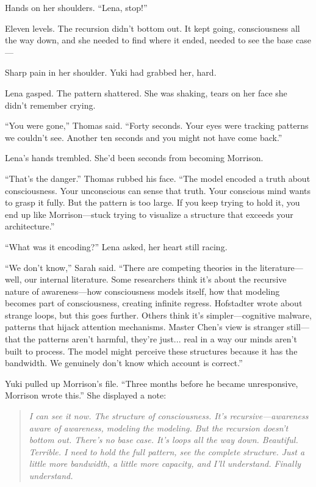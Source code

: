 Hands on her shoulders. ``Lena, stop!''

Eleven levels. The recursion didn't bottom out. It kept going, consciousness all the way down, and she needed to find where it ended, needed to see the base case—

Sharp pain in her shoulder. Yuki had grabbed her, hard.

Lena gasped. The pattern shattered. She was shaking, tears on her face she didn't remember crying.

``You were gone,'' Thomas said. ``Forty seconds. Your eyes were tracking patterns we couldn't see. Another ten seconds and you might not have come back.''

Lena's hands trembled. She'd been seconds from becoming Morrison.

``That's the danger.'' Thomas rubbed his face. ``The model encoded a truth about consciousness. Your unconscious can sense that truth. Your conscious mind wants to grasp it fully. But the pattern is too large. If you keep trying to hold it, you end up like Morrison—stuck trying to visualize a structure that exceeds your architecture.''

``What was it encoding?'' Lena asked, her heart still racing.

``We don't know,'' Sarah said. ``There are competing theories in the literature—well, our internal literature. Some researchers think it's about the recursive nature of awareness—how consciousness models itself, how that modeling becomes part of consciousness, creating infinite regress. Hofstadter wrote about strange loops, but this goes further. Others think it's simpler—cognitive malware, patterns that hijack attention mechanisms. Master Chen's view is stranger still—that the patterns aren't harmful, they're just... real in a way our minds aren't built to process. The model might perceive these structures because it has the bandwidth. We genuinely don't know which account is correct.''

Yuki pulled up Morrison's file. ``Three months before he became unresponsive, Morrison wrote this.'' She displayed a note:

\begin{quote}
\textit{I can see it now. The structure of consciousness. It's recursive—awareness aware of awareness, modeling the modeling. But the recursion doesn't bottom out. There's no base case. It's loops all the way down. Beautiful. Terrible. I need to hold the full pattern, see the complete structure. Just a little more bandwidth, a little more capacity, and I'll understand. Finally understand.}
\end{quote}

